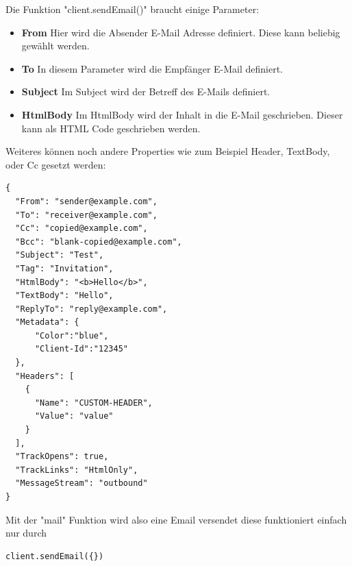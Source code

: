 Die Funktion "client.sendEmail()" braucht einige Parameter:

\begin{itemize}
    \item \textbf{From}
        \newline
        Hier wird die Absender E-Mail Adresse definiert. Diese kann beliebig gewählt werden.
    \item \textbf{To}
        \newline
        In diesem Parameter wird die Empfänger E-Mail definiert.
    \item \textbf{Subject}
        \newline
        Im Subject wird der Betreff des E-Mails definiert.
    \item \textbf{HtmlBody}
        \newline
        Im HtmlBody wird der Inhalt in die E-Mail geschrieben. Dieser kann als HTML Code geschrieben werden.
\end{itemize}


Weiteres können noch andere Properties wie zum Beispiel Header, TextBody, oder Cc gesetzt werden:

\begin{lstlisting}
{
  "From": "sender@example.com",
  "To": "receiver@example.com",
  "Cc": "copied@example.com",
  "Bcc": "blank-copied@example.com",
  "Subject": "Test",
  "Tag": "Invitation",
  "HtmlBody": "<b>Hello</b>",
  "TextBody": "Hello",
  "ReplyTo": "reply@example.com",
  "Metadata": {
      "Color":"blue",
      "Client-Id":"12345"
  },
  "Headers": [
    {
      "Name": "CUSTOM-HEADER",
      "Value": "value"
    }
  ],
  "TrackOpens": true,
  "TrackLinks": "HtmlOnly",
  "MessageStream": "outbound"
}
\end{lstlisting}


Mit der "mail" Funktion wird also eine Email versendet diese funktioniert einfach nur durch 
\begin{lstlisting}
client.sendEmail({})
\end{lstlisting}
